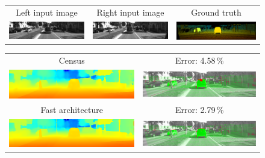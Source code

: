 \documentclass[twoside,11pt]{article}
\begin{document}
\begin{figure}[p]
\setlength\tabcolsep{2pt}
\begin{center}
\begin{tabular}{ccc}%
\rule{0pt}{4ex}Left input image &
Right input image &
Ground truth \\
\includegraphics[scale=0.5]{img/kitti2015_000122_10L_.png} &
\includegraphics[scale=0.5]{img/kitti2015_000122_10R_.png} &
\includegraphics[scale=0.5]{img/kitti2015_122_gt_.png}
\end{tabular}

\begin{tabular}{cc}
Census &
Error: 4.58\,\% \\
\includegraphics[scale=0.5]{img/kitti2015_census_122_pred_.png} &
\includegraphics[scale=0.5]{img/kitti2015_census_122_err_.png}\\

Fast architecture &
Error: 2.79\,\% \\
\includegraphics[scale=0.5]{img/kitti2015_fast_122_pred_.png} &
\includegraphics[scale=0.5]{img/kitti2015_fast_122_err_.png} \\


\end{tabular}
\end{center}
\end{figure}
\end{document}
